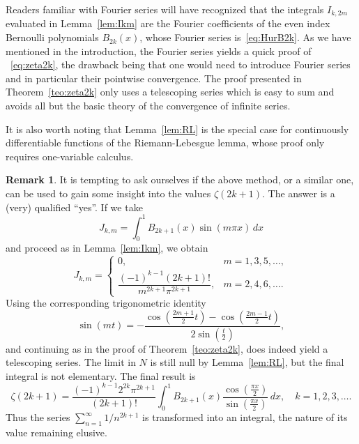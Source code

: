 \documentclass[11pt, oneside]{article}
\theoremstyle{plain}
\theoremstyle{definition}
\newtheorem{remark}[theorem]{Remark}
\begin{document}
Readers familiar with Fourier series will have recognized that the integrals $I_{k,2m}$ evaluated in Lemma~\ref{lem:Ikm} are the Fourier coefficients of the even index Bernoulli polynomials $B_{2k}(x)$, whose Fourier series is~\eqref{eq:HurB2k}.
As we have mentioned in the introduction, the Fourier series yields a quick proof of
~\eqref{eq:zeta2k}, the drawback being that one would need to introduce Fourier series and in particular their pointwise convergence. The proof presented in Theorem~\ref{teo:zeta2k} only uses a telescoping series which is easy to sum and avoids all but the basic theory of the convergence of infinite series. 

It is also worth noting that Lemma~\ref{lem:RL} is the special case for continuously differentiable functions of the Riemann-Lebesgue lemma, whose proof only requires one-variable calculus.


\begin{remark}
It is tempting to ask ourselves if the above method, or a similar one, can be used to gain some insight into the values $\zeta(2k+1)$. The answer is a (very) qualified ``yes''. If we take
\[
  J_{k,m} = \int_0^{1} B_{2k+1}(x) \sin(m\pi x)\,dx
\]
and proceed as in Lemma~\ref{lem:Ikm}, we obtain
\[
  J_{k,m} = 
  \begin{cases}
  0, & m=1,3,5,\dots, \\
  \dfrac{(-1)^{k-1}(2k+1)!}{m^{2k+1} \pi^{2k+1}}, & m=2,4,6,\dots.
  \end{cases}
\]
Using the corresponding trigonometric identity
\[
  \sin(mt) = -\frac{\cos(\frac{2m+1}{2}t)-\cos(\frac{2m-1}{2}t)}{2\sin(\frac{t}{2})},
\]
and continuing as in the proof of Theorem~\ref{teo:zeta2k}, does indeed yield a telescoping series. The limit in $N$ is still null by Lemma~\ref{lem:RL}, but the final integral is not elementary. The final result is
\[
  \zeta(2k+1) = \frac{(-1)^{k-1}2^{2k}\pi^{2k+1}}{(2k+1)!}
  \int_0^{1} B_{2k+1}(x) \frac{\cos(\frac{\pi x}{2})}{\sin(\frac{\pi x}{2})}\,dx,
  \quad k = 1,2,3,\dots.
\]
Thus the series $\sum_{n=1}^{\infty} 1/n^{2k+1}$ is transformed into an integral, the nature of its value remaining elusive.
\end{remark}
\end{document}

